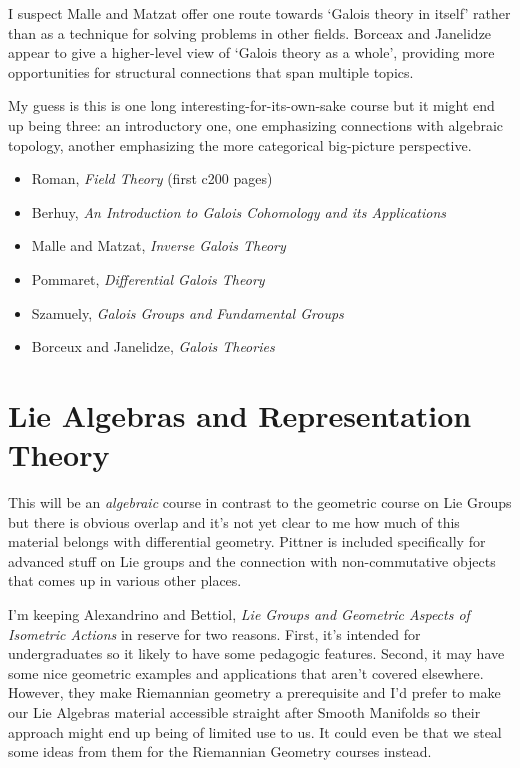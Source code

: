 \documentclass[article]{article}
\begin{document}
I suspect Malle and Matzat offer one route towards `Galois theory in itself' rather than as a technique for solving problems in other fields. Borceax and Janelidze appear to give a higher-level view of `Galois theory as a whole', providing more opportunities for structural connections that span multiple topics.

My guess is this is one long interesting-for-its-own-sake course but it might end up being three: an introductory one, one emphasizing connections with algebraic topology, another emphasizing the more categorical big-picture perspective.

\begin{itemize}
	\item[]{Roman, \textit{Field Theory} (first c200 pages)}
	\item[]{Berhuy, \textit{An Introduction to Galois Cohomology and its Applications}}
	\item[]{Malle and Matzat, \textit{Inverse Galois Theory}}
	\item[]{Pommaret, \textit{Differential Galois Theory}}
	\item[]{Szamuely, \textit{Galois Groups and Fundamental Groups}}
	\item[]{Borceux and Janelidze, \textit{Galois Theories}}
\end{itemize}

\section{Lie Algebras and Representation Theory}

This will be an \textit{algebraic} course in contrast to the geometric course on Lie Groups but there is obvious overlap and it's not yet clear to me how much of this material belongs with differential geometry. Pittner is included specifically for advanced stuff on Lie groups and the connection with non-commutative objects that comes up in various other places.

I'm keeping Alexandrino and Bettiol, \textit{Lie Groups and Geometric Aspects of Isometric Actions} in reserve for two reasons. First, it's intended for undergraduates so it likely to have some pedagogic features. Second, it may have some nice geometric examples and applications that aren't covered elsewhere. However, they make Riemannian geometry a prerequisite and I'd prefer to make our Lie Algebras material accessible straight after Smooth Manifolds so their approach might end up being of limited use to us. It could even be that we steal some ideas from them for the Riemannian Geometry courses instead.
\end{document}

